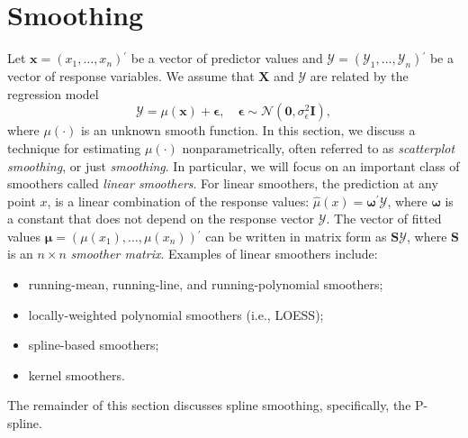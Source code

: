 \documentclass[cmfont,usenames,dvipsnames,leqno]{afit-etd}\usepackage[]{graphicx}\usepackage[]{color}
\newcommand{\trans}{\ensuremath{^\prime}}
\newcommand{\bc}[1]{\ensuremath{\bm{\mathcal{#1}}}}
\newcommand{\mc}[1]{\ensuremath{\mathcal{#1}}}
\newcommand{\wh}[1]{\ensuremath{\widehat{#1}}}
\newcommand{\X}{\ensuremath{\bm{X}}}
\begin{document}
\section{Smoothing}
\label{sec:penalized-regression-splines}
Let $\bm{x} = \left(x_1, \dotsc, x_n \right)\trans$ be a vector of predictor values and $\bc{Y} = \left( \mc{Y}_1, \dotsc, \mc{Y}_n \right)\trans$ be a vector of response variables. We assume that $\X$ and $\bc{Y}$ are related by the regression model
\begin{equation*}
  \bc{Y} = \mu(\bm{x}) + \bm{\epsilon}, \quad \bm{\epsilon} \sim \mc{N}(\bm{0}, \sigma_\epsilon^2\bm{I}),
\end{equation*}
where $\mu(\cdot)$ is an unknown smooth function. In this section, we discuss a technique for estimating $\mu(\cdot)$ nonparametrically, often referred to as \textit{scatterplot smoothing}, or just \textit{smoothing}. In particular, we will focus on an important class of smoothers called \textit{linear smoothers}. For linear smoothers, the prediction at any point $x$, is a linear combination of the response values: $\wh{\mu}(x) = \bm{\omega}\trans\bc{Y}$, where $\bm{\omega}$ is a constant that does not depend on the response vector $\bc{Y}$. The vector of fitted values $\wh{\bm{\mu}} = \left( \mu(x_1), \dotsc, \mu(x_n) \right)\trans$ can be written in matrix form as $\bm{S}\bc{Y}$, where $\bm{S}$ is an $n \times n$ \textit{smoother matrix}. Examples of linear smoothers include:
\begin{itemize}
  \item running-mean, running-line, and running-polynomial smoothers;
  \item locally-weighted polynomial smoothers (i.e., LOESS);
  \item spline-based smoothers;
  \item kernel smoothers.
\end{itemize}
The remainder of this section discusses spline smoothing, specifically, the \ac{P-spline}.  

\end{document}
